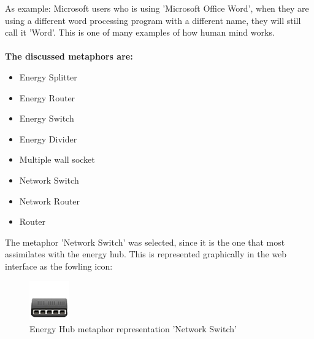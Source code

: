As example: Microsoft users who is using 'Microsoft Office Word', when they are using a different word processing program with a different name, they will still call it 'Word'. This is one of many examples of how human mind works.\\\\
\textbf{The discussed metaphors are:}
\begin{itemize}
	\item Energy Splitter
	\item Energy Router
	\item Energy Switch
	\item Energy Divider
	\item Multiple wall socket
	\item Network Switch
	\item Network Router
	\item Router
\end{itemize}

The metaphor 'Network Switch' was selected, since it is the one that most assimilates with the energy hub. This is represented graphically in the web interface as the fowling icon:

\begin{figure}[H]
	\center
	\includegraphics[width=0.15\textwidth]{images/dock_hub.png}
   	\caption{Energy Hub metaphor representation 'Network Switch'}
\end{figure}








